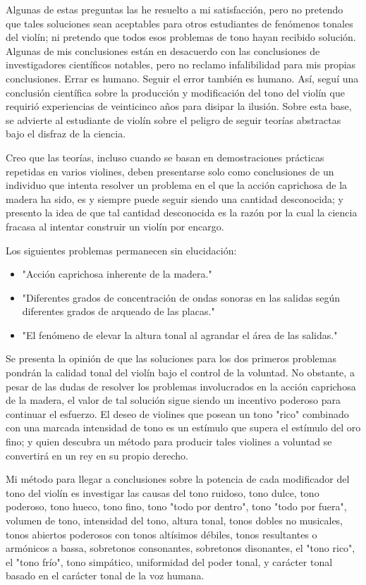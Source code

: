 Algunas de estas preguntas las he resuelto a mi satisfacción, pero no pretendo que tales soluciones sean aceptables para otros estudiantes de fenómenos tonales del violín; ni pretendo que todos esos problemas de tono hayan recibido solución. Algunas de mis conclusiones están en desacuerdo con las conclusiones de investigadores científicos notables, pero no reclamo infalibilidad para mis propias conclusiones. Errar es humano. Seguir el error también es humano. Así, seguí una conclusión científica sobre la producción y modificación del tono del violín que requirió experiencias de veinticinco años para disipar la ilusión. Sobre esta base, se advierte al estudiante de violín sobre el peligro de seguir teorías abstractas bajo el disfraz de la ciencia.

Creo que las teorías, incluso cuando se basan en demostraciones prácticas repetidas en varios violines, deben presentarse solo como conclusiones de un individuo que intenta resolver un problema en el que la acción caprichosa de la madera ha sido, es y siempre puede seguir siendo una cantidad desconocida; y presento la idea de que tal cantidad desconocida es la razón por la cual la ciencia fracasa al intentar construir un violín por encargo.

Los siguientes problemas permanecen sin elucidación:
\begin{itemize}
    \item "Acción caprichosa inherente de la madera."
    \item "Diferentes grados de concentración de ondas sonoras en las salidas según diferentes grados de arqueado de las placas."
    \item "El fenómeno de elevar la altura tonal al agrandar el área de las salidas."
\end{itemize}

Se presenta la opinión de que las soluciones para los dos primeros problemas pondrán la calidad tonal del violín bajo el control de la voluntad. No obstante, a pesar de las dudas de resolver los problemas involucrados en la acción caprichosa de la madera, el valor de tal solución sigue siendo un incentivo poderoso para continuar el esfuerzo. El deseo de violines que posean un tono "rico" combinado con una marcada intensidad de tono es un estímulo que supera el estímulo del oro fino; y quien descubra un método para producir tales violines a voluntad se convertirá en un rey en su propio derecho.

Mi método para llegar a conclusiones sobre la potencia de cada modificador del tono del violín es investigar las causas del tono ruidoso, tono dulce, tono poderoso, tono hueco, tono fino, tono "todo por dentro", tono "todo por fuera", volumen de tono, intensidad del tono, altura tonal, tonos dobles no musicales, tonos abiertos poderosos con tonos altísimos débiles, tonos resultantes o armónicos a bassa, sobretonos consonantes, sobretonos disonantes, el "tono rico", el "tono frío", tono simpático, uniformidad del poder tonal, y carácter tonal basado en el carácter tonal de la voz humana.

